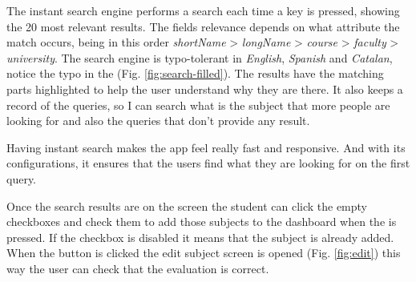 The instant search engine performs a search each time a key is pressed, showing the 20 most relevant results. The fields relevance depends on what attribute the match occurs, being in this order \textit{shortName} > \textit{longName} > \textit{course} > \textit{faculty} > \textit{university}. The search engine is typo-tolerant in \textit{English}, \textit{Spanish} and \textit{Catalan}, notice the typo in the (Fig. \ref{fig:search-filled}). The results have the matching parts highlighted to help the user understand why they are there. It also keeps a record of the queries, so I can search what is the subject that more people are looking for and also the queries that don't provide any result.

Having instant search makes the app feel really fast and responsive. And with its configurations, it ensures that the users find what they are looking for on the first query. 

Once the search results are on the screen the student can click the empty checkboxes   and check them  to add those subjects to the dashboard when the  is pressed. If the checkbox is disabled  it means that the subject is already added. When the  button is clicked the edit subject screen is opened (Fig. \ref{fig:edit}) this way the user can check that the evaluation is correct. 

